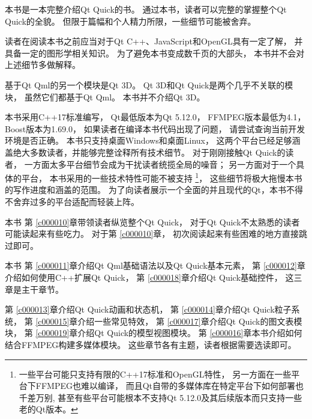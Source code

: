 本书是一本完整介绍Qt Quick的书。
通过本书，读者可以完整的掌握整个Qt Quick的全貌。
但限于篇幅和个人精力所限，一些细节可能被舍弃。

读者在阅读本书之前应当对于Qt C++、JavaScript和OpenGL具有一定了解，
并具备一定的图形学相关知识。
为了避免本书变成数千页的大部头，
本书并不会对上述细节多做解释。

基于Qt Qml的另一个模块是Qt 3D。
Qt 3D和Qt Quick是两个几乎不关联的模块，
虽然它们都基于Qt Qml。
本书并不介绍Qt 3D。

本书采用C++17标准编写，
Qt最低版本为Qt 5.12.0，
FFMPEG版本最低为4.1，
Boost版本为1.69.0，
如果读者在编译本书代码出现了问题，
请尝试查询当前开发环境是否正确。
本书只支持桌面Windows和桌面Linux，
这两个平台已经足够涵盖绝大多数读者，并能够完整诠释所有技术细节。
对于刚刚接触Qt Quick的读者，
一方面太多平台细节会成为干扰读者统揽全局的噪音；
另一方面对于一个具体的平台，
本书采用的一些技术特性可能不被支持
\footnote{
一些平台可能只支持有限的C++17标准和OpenGL特性，
另一方面在一些平台下FFMPEG也难以编译，
而且Qt自带的多媒体库在特定平台下如何部署也千差万别,
甚至有些平台可能根本不支持Qt 5.12.0及其后续版本而只支持一些老的Qt版本。
}，
这些细节将极大拖慢本书的写作进度和涵盖的范围。
为了向读者展示一个全面的并且现代的Qt，本书不得不舍弃过多的平台适配而轻装上阵。

本书
第 \ref{c000010}章带领读者纵览整个Qt Quick，
对于Qt Quick不太熟悉的读者可能读起来有些吃力。
对于第 \ref{c000010}章，
初次阅读起来有些困难的地方直接跳过即可。

本书
第 \ref{c000011}章介绍Qt Qml基础语法以及Qt Quick基本元素，
第 \ref{c000012}章介绍如何使用C++扩展Qt Quick，
第 \ref{c000018}章介绍Qt Quick基础控件，
这三章是主干章节。

第 \ref{c000013}章介绍Qt Quick动画和状态机，
第 \ref{c000014}章介绍Qt Quick粒子系统，
第 \ref{c000015}章介绍一些常见特效，
第 \ref{c000017}章介绍Qt Quick的图文表模块，
第 \ref{c000019}章介绍Qt Quick的模型视图模块。
第 \ref{c000016}章本书介绍如何结合FFMPEG构建多媒体模块。
这些章节各有主题，读者根据需要选读即可。






















